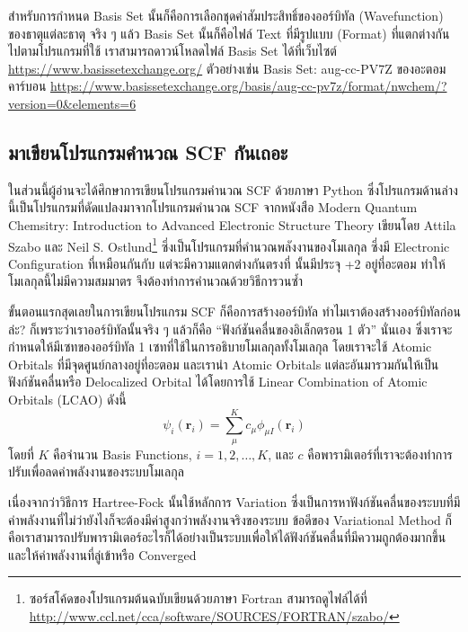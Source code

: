 สำหรับการกำหนด Basis Set นั้นก็คือการเลือกชุดค่าสัมประสิทธิ์ของออร์บิทัล (Wavefunction) ของธาตุแต่ละธาตุ จริง ๆ แล้ว Basis Set นั้นก็คือไฟล์ Text ที่มีรูปแบบ (Format) ที่แตกต่างกันไปตามโปรแกรมที่ใช้ เราสามารถดาวน์โหลดไฟล์ Basis Set ได้ที่เว็บไซต์ \url{https://www.basissetexchange.org/} ตัวอย่างเช่น Basis Set: aug-cc-PV7Z ของอะตอมคาร์บอน \url{https://www.basissetexchange.org/basis/aug-cc-pv7z/format/nwchem/?version=0&elements=6}

\subsection{มาเขียนโปรแกรมคำนวณ SCF กันเถอะ}

ในส่วนนี้ผู้อ่านจะได้ศึกษาการเขียนโปรแกรมคำนวณ SCF ด้วยภาษา Python ซึ่งโปรแกรมด้านล่างนี้เป็นโปรแกรมที่ดัดแปลงมาจากโปรแกรมคำนวณ SCF จากหนังสือ Modern Quantum Chemsitry: Introduction to Advanced Electronic Structure Theory เขียนโดย Attila Szabo และ Neil S. Ostlund\footnote{ซอร์สโค้ดของโปรแกรมต้นฉบับเขียนด้วยภาษา Fortran สามารถดูไฟล์ได้ที่ \url{http://www.ccl.net/cca/software/SOURCES/FORTRAN/szabo/}} ซึ่งเป็นโปรแกรมที่คำนวณพลังงานของโมเลกุล  ซึ่งมี Electronic Configuration ที่เหมือนกันกับ  แต่จะมีความแตกต่างกันตรงที่  นั้นมีประจุ +2 อยู่ที่อะตอม  ทำให้โมเลกุลนี้ไม่มีความสมมาตร จึงต้องทำการคำนวณด้วยวิธีการวนซ้ำ

\noindent {}

ขั้นตอนแรกสุดเลยในการเขียนโปรแกรม SCF ก็คือการสร้างออร์บิทัล ทำไมเราต้องสร้างออร์บิทัลก่อนล่ะ? ก็เพราะว่าเราออร์บิทัลนั้นจริง ๆ แล้วก็คือ \enquote{ฟังก์ชันคลื่นของอิเล็กตรอน 1 ตัว} นั่นเอง ซึ่งเราจะกำหนดให้มีเซทของออร์บิทัล 1 เซทที่ใช้ในการอธิบายโมเลกุลทั้งโมเลกุล โดยเราจะใช้ Atomic Orbitals ที่มีจุดศูนย์กลางอยู่ที่อะตอม และเรานำ Atomic Orbitals แต่ละอันมารวมกันให้เป็นฟังก์ชันคลื่นหรือ Delocalized Orbital ได้โดยการใช้ Linear Combination of Atomic Orbitals (LCAO) ดังนี้
%
\begin{equation}
  \psi_i(\boldsymbol{r}_i)
  =
  \sum^{K}_{\mu} c_{\mu} \phi_{\mu I}(\boldsymbol{r}_i)
\end{equation}
%
โดยที่ $K$ คือจำนวน Basis Functions, $i = 1, 2, \dots, K$, และ $c$ คือพารามิเตอร์ที่เราจะต้องทำการปรับเพื่อลดค่าพลังงานของระบบโมเลกุล

เนื่องจากว่าวิธีการ Hartree-Fock นั้นใช้หลักการ Variation ซึ่งเป็นการหาฟังก์ชันคลื่นของระบบที่มีค่าพลังงานที่ไม่ว่ายังไงก็จะต้องมีค่าสูงกว่าพลังงานจริงของระบบ ข้อดีของ Variational Method ก็คือเราสามารถปรับพารามิเตอร์อะไรก็ได้อย่างเป็นระบบเพื่อให้ได้ฟังก์ชันคลื่นที่มีความถูกต้องมากขึ้นและให้ค่าพลังงานที่ลู่เข้าหรือ Converged


